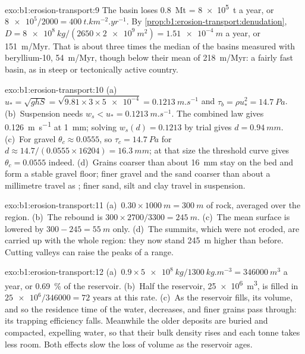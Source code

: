\begin{solution}{exo:b1:erosion-transport:9}
The basin loses \qty{0.8}{Mt} = \qty{8e5}{t} a year, or $\num{8e5}/2000 =
\qty{400}{t.km^{-2}.yr^{-1}}$. By \cref{prop:b1:erosion-transport:denudation},
$D = \qty{8e8}{kg}/(2650 \times \qty{2e9}{m^2}) = \qty{1.51e-4}{m}$ a year, or
\qty{151}{m/Myr}. That is about three times the median of the basins measured
with beryllium-10, \qty{54}{m/Myr}, though below their mean of
\qty{218}{m/Myr}: a fairly fast basin, as in steep or tectonically active
country.
\end{solution}

\begin{solution}{exo:b1:erosion-transport:10}
(a)~$u_* = \sqrt{g h S} = \sqrt{9.81 \times 3 \times \num{5e-4}} =
\qty{0.1213}{m.s^{-1}}$ and $\tau_b = \rho u_*^2 = \qty{14.7}{Pa}$.
(b)~Suspension needs $w_s < u_* = \qty{0.1213}{m.s^{-1}}$. The combined law
gives \qty{0.126}{m.s^{-1}} at \qty{1}{mm}; solving
$w_s(d) = 0.1213$ by trial gives $d = \qty{0.94}{mm}$. (c)~For gravel
$\theta_c \approx 0.0555$, so $\tau_c = \qty{14.7}{Pa}$ for $d \approx
14.7/(0.0555 \times 16204) = \qty{16.3}{mm}$; at that size the threshold curve gives
$\theta_c = 0.0555$ indeed. (d)~Grains coarser than about \qty{16}{mm} stay on
the bed and form a stable gravel floor; finer gravel and the sand coarser than
about a millimetre travel as ; finer sand, silt and clay travel in
suspension.
\end{solution}

\begin{solution}{exo:b1:erosion-transport:11}
(a)~$0.30 \times \qty{1000}{m} = \qty{300}{m}$ of rock, averaged over the
region. (b)~The rebound is $300 \times 2700/3300 = \qty{245}{m}$. (c)~The mean
surface is lowered by $300 - 245 = \qty{55}{m}$ only. (d)~The summits, which
were not eroded, are carried up with the whole region: they now stand
\qty{245}{m} higher than before. Cutting valleys can raise the peaks of a range.
\end{solution}

\begin{solution}{exo:b1:erosion-transport:12}
(a)~$0.9 \times \qty{5e8}{kg}/\qty{1300}{kg.m^{-3}} = \qty{346000}{m^3}$ a year,
or \qty{0.69}{\percent} of the reservoir. (b)~Half the reservoir,
\qty{25e6}{m^3}, is filled in $\num{25e6}/\num{346000} = \num{72}\text{ years}$ at this
rate. (c)~As the reservoir fills, its volume, and so the residence time of the
water, decreases, and finer grains pass through: its trapping efficiency falls.
Meanwhile the older deposits are buried and compacted, expelling water, so that
their bulk density rises and each tonne takes less room. Both effects slow the
loss of volume as the reservoir ages.
\end{solution}

